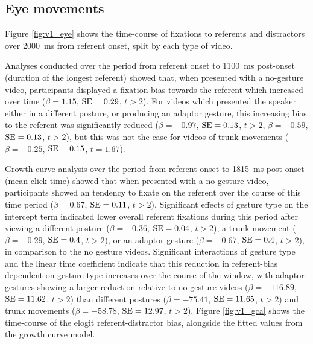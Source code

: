 \documentclass[a4paper,man,natbib]{apa6}
\newcommand{\resultsLM}[3]{$\beta = #1$, $\textnormal{SE} = #2$, $t #3$}
\begin{document}
\subsection{Eye movements}
Figure \ref{fig:v1_eye} shows the time-course of fixations to referents and distractors over 2000~ms from referent onset, split by each type of video.

Analyses conducted over the period from referent onset to 1100~ms post-onset (duration of the longest referent) showed that, when presented with a no-gesture video, participants displayed a fixation bias towards the referent which increased over time (\resultsLM{1.15}{0.29}{>2}).
For videos which presented the speaker either in a different posture, or producing an adaptor gesture, this increasing bias to the referent was significantly reduced
(\resultsLM{-0.97}{0.13}{>2}, \resultsLM{-0.59}{0.13}{>2}), but this was not the case for videos of trunk movements (\resultsLM{-0.25}{0.15}{=1.67}). 

Growth curve analysis over the period from referent onset to 1815~ms post-onset (mean click time) showed that when presented with a no-gesture video, participants showed an tendency to fixate on the referent over the course of this time period (\resultsLM{0.67}{0.11}{>2}). %
Significant effects of gesture type on the intercept term indicated lower overall referent fixations during this period after viewing a different posture (\resultsLM{-0.36}{0.04}{>2}), a trunk movement (\resultsLM{-0.29}{0.4}{>2}), or an adaptor gesture (\resultsLM{-0.67}{0.4}{>2}), in comparison to the no gesture videos.
Significant interactions of gesture type and the linear time coefficient indicate that this reduction in referent-bias dependent on gesture type increases over the course of the window, with adaptor gestures showing a larger reduction relative to no gesture videos (\resultsLM{-116.89}{11.62}{>2}) than different postures (\resultsLM{-75.41}{11.65}{>2}) and trunk movements (\resultsLM{-58.78}{12.97}{>2}). 
Figure \ref{fig:v1_gca} shows the time-course of the elogit referent-distractor bias, alongside the fitted values from the growth curve model. 
\end{document}
